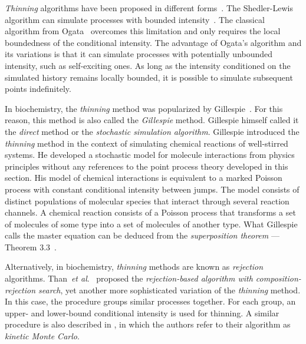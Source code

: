 \documentclass{juliacon}
\numberwithin{equation}{section}
\newcommand{\etal}{\textit{et al}.}
\begin{document}
\textit{Thinning} algorithms have been proposed in different forms~\cite{daley2003}. The Shedler-Lewis algorithm can simulate processes with bounded intensity~\cite{lewis1976}. The classical algorithm from Ogata~\cite{ogata1981} overcomes this limitation and only requires the local boundedness of the conditional intensity. The advantage of Ogata's algorithm and its variations is that it can simulate processes with potentially unbounded intensity, such as self-exciting ones. As long as the intensity conditioned on the simulated history remains locally bounded, it is possible to simulate subsequent points indefinitely.

In biochemistry, the \textit{thinning} method was popularized by Gillespie~\cite{gillespie1976,gillespie1977}. For this reason, this method is also called the \textit{Gillespie} method. Gillespie himself called it the \textit{direct} method or the \textit{stochastic simulation algorithm}. Gillespie introduced the \textit{thinning} method in the context of simulating chemical reactions of well-stirred systems. He developed a stochastic model for molecule interactions from physics principles without any references to the point process theory developed in this section. His model of chemical interactions is equivalent to a marked Poisson process with constant conditional intensity between jumps. The model consists of distinct populations of molecular species that interact through several reaction channels. A chemical reaction consists of a Poisson process that transforms a set of molecules of some type into a set of molecules of another type. What Gillespie calls the master equation can be deduced from the \textit{superposition theorem} --- Theorem 3.3~\cite{last2017}.

Alternatively, in biochemistry, \textit{thinning} methods are known as \textit{rejection} algorithms. Than~\etal~\cite{thanh2014,thanh2017} proposed the \textit{rejection-based algorithm with composition-rejection search}, yet another more sophisticated variation of the \textit{thinning} method. In this case, the procedure groups similar processes together. For each group, an upper- and lower-bound conditional intensity is used for thinning. A similar procedure is also described in \cite{slepoy2008}, in which the authors refer to their algorithm as \textit{kinetic Monte Carlo}.
\end{document}
